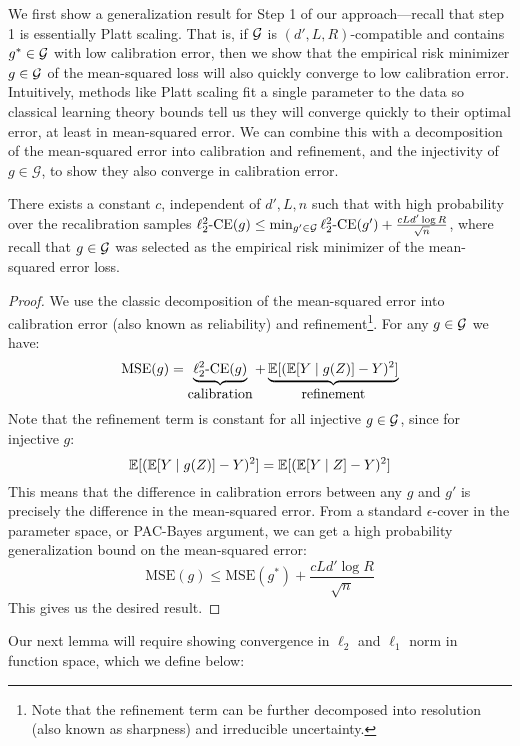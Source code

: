 We first show a generalization result for Step 1 of our approach---recall that step 1 is essentially Platt scaling.
That is, if $\mathcal{G}{}$ is $(d', L, R)$-compatible and contains $g^* \in \mathcal{G}{}$ with low calibration error, then we show that the empirical risk minimizer $g \in \mathcal{G}{}$ of the mean-squared loss will also quickly converge to low calibration error.
Intuitively, methods like Platt scaling fit a single parameter to the data so classical learning theory bounds tell us they will converge quickly to their optimal error, at least in mean-squared error.
We can combine this with a decomposition of the mean-squared error into calibration and refinement, and the injectivity of $g \in \mathcal{G}$, to show they also converge in calibration error.

\begin{lemma}
\label{lem:platt_scaling_bound}
There exists a constant $c$, independent of $d', L, n$ such that with high probability over the recalibration samples $\ell_2^2\mbox{-CE}(g) \leq \min_{g' \in \mathcal{G}{}}\ell_2^2\mbox{-CE}(g') + \frac{cLd' \log{R}}{\sqrt{n}}$, where recall that $g \in \mathcal{G}{}$ was selected as the empirical risk minimizer of the mean-squared error loss.
\end{lemma}

\begin{proof}
We use the classic decomposition of the mean-squared error into calibration error (also known as reliability) and refinement\footnote{Note that the refinement term can be further decomposed into resolution (also known as sharpness) and irreducible uncertainty.}. For any $g \in \mathcal{G}{}$ we have:
\[ \mbox{MSE}(g) = \underbrace{\ell_2^2\mbox{-CE}(g)}_{\mbox{calibration}} + \underbrace{\mathbb{E}[(\mathbb{E}[Y \mid g(Z)] - Y)^2]}_{\mbox{refinement}} \]
Note that the refinement term is constant for all injective $g \in \mathcal{G}{}$, since for injective $g$:
\[ \mathbb{E}[(\mathbb{E}[Y \mid g(Z)] - Y)^2] = \mathbb{E}[(\mathbb{E}[Y \mid Z] - Y)^2] \]
This means that the difference in calibration errors between any $g$ and $g'$ is precisely the difference in the mean-squared error. From a standard $\epsilon$-cover in the parameter space, or PAC-Bayes argument, we can get a high probability generalization bound on the mean-squared error:
\[ \mbox{MSE}(g) \leq \mbox{MSE}(g^*) + \frac{cLd' \log{R}}{\sqrt{n}} \]
This gives us the desired result.
\end{proof}

Our next lemma will require showing convergence in $\ell_2$ and $\ell_1$ norm in function space, which we define below:

